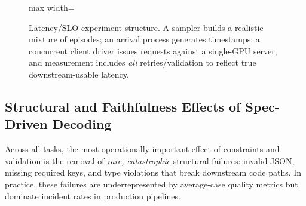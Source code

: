 \documentclass[11pt]{article}
\newcommand{\slo}{\ensuremath{\mathrm{SLO}}}
\begin{document}
\begin{figure}[t]
\centering
\begin{adjustbox}{max width=\linewidth}
\end{adjustbox}
\caption{Latency/SLO experiment structure.
A sampler builds a realistic mixture of episodes; an arrival process generates timestamps; a concurrent client driver issues requests against a single-GPU server; and measurement includes \emph{all} retries/validation to reflect true downstream-usable latency.}
\label{fig:slo-harness}
\end{figure}

\subsection{Structural and Faithfulness Effects of Spec-Driven Decoding}
\label{sec:results-structure-faith}

Across all tasks, the most operationally important effect of constraints and validation is the removal of \emph{rare, catastrophic} structural failures:
invalid JSON, missing required keys, and type violations that break downstream code paths.
In practice, these failures are underrepresented by average-case quality metrics but dominate incident rates in production pipelines.
\end{document}
